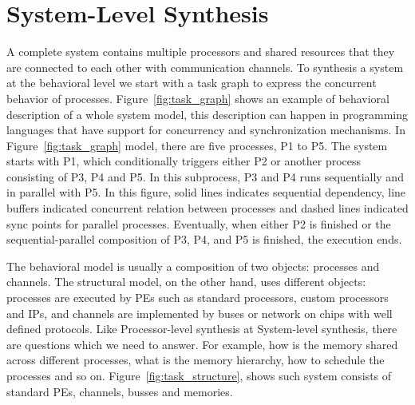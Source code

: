 \section{System-Level Synthesis}

A complete system contains multiple processors and shared resources that they are connected to each other with communication channels.
To synthesis a system at the behavioral level we start with a task graph to express the concurrent behavior of processes.
Figure~\ref{fig:task_graph} shows an example of behavioral description of a whole system model, this description can happen in programming languages that have support for concurrency and synchronization mechanisms.
In Figure~\ref{fig:task_graph} model, there are five processes, P1 to P5.
The system starts with P1, which conditionally triggers either P2 or another process consisting of P3, P4 and P5.
In this subprocess, P3 and P4 runs sequentially and in parallel with P5. In this figure, solid lines indicates sequential dependency, line buffers indicated concurrent relation between processes and dashed lines indicated sync points for parallel processes.
Eventually, when either P2 is finished or the sequential-parallel composition of P3, P4, and P5 is finished, the execution ends.

The behavioral model is usually a composition of two objects: processes and channels.
The structural model, on the other hand, uses different objects: processes are executed by PEs such as standard processors, custom processors and IPs, and channels are implemented by buses or network on chips with well defined protocols.
Like Processor-level synthesis at System-level synthesis, there are questions which we need to answer.
For example, how is the memory shared across different processes, what is the memory hierarchy, how to schedule the processes and so on.
Figure~\ref{fig:task_structure}, shows such system consists of standard PEs, channels, busses and memories.

